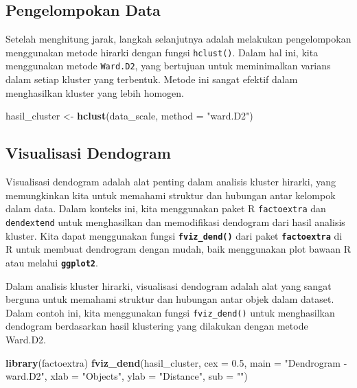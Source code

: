 \documentclass[
  oneside]{book}
\newenvironment{Shaded}{\begin{snugshade}}{\end{snugshade}}
\newcommand{\AttributeTok}[1]{\textcolor[rgb]{0.13,0.29,0.53}{#1}}
\newcommand{\FloatTok}[1]{\textcolor[rgb]{0.00,0.00,0.81}{#1}}
\newcommand{\FunctionTok}[1]{\textcolor[rgb]{0.13,0.29,0.53}{\textbf{#1}}}
\newcommand{\NormalTok}[1]{#1}
\newcommand{\OtherTok}[1]{\textcolor[rgb]{0.56,0.35,0.01}{#1}}
\newcommand{\StringTok}[1]{\textcolor[rgb]{0.31,0.60,0.02}{#1}}
\begin{document}
\subsection*{Pengelompokan Data}\label{pengelompokan-data}

Setelah menghitung jarak, langkah selanjutnya adalah melakukan pengelompokan menggunakan metode hirarki dengan fungsi \texttt{hclust()}. Dalam hal ini, kita menggunakan metode \texttt{Ward.D2}, yang bertujuan untuk meminimalkan varians dalam setiap kluster yang terbentuk. Metode ini sangat efektif dalam menghasilkan kluster yang lebih homogen.

\begin{Shaded}
\begin{Highlighting}[]
\NormalTok{hasil\_cluster }\OtherTok{\textless{}{-}} \FunctionTok{hclust}\NormalTok{(data\_scale, }\AttributeTok{method =} \StringTok{"ward.D2"}\NormalTok{)}
\end{Highlighting}
\end{Shaded}

\subsection*{Visualisasi Dendogram}\label{visualisasi-dendogram}

Visualisasi dendogram adalah alat penting dalam analisis kluster hirarki, yang memungkinkan kita untuk memahami struktur dan hubungan antar kelompok dalam data. Dalam konteks ini, kita menggunakan paket R \texttt{factoextra} dan \texttt{dendextend} untuk menghasilkan dan memodifikasi dendogram dari hasil analisis kluster. Kita dapat menggunakan fungsi \textbf{\texttt{fviz\_dend()}} dari paket \textbf{\texttt{factoextra}} di R untuk membuat dendrogram dengan mudah, baik menggunakan plot bawaan R atau melalui \textbf{\texttt{ggplot2}}.

Dalam analisis kluster hirarki, visualisasi dendogram adalah alat yang sangat berguna untuk memahami struktur dan hubungan antar objek dalam dataset. Dalam contoh ini, kita menggunakan fungsi \texttt{fviz\_dend()} untuk menghasilkan dendogram berdasarkan hasil klustering yang dilakukan dengan metode Ward.D2.

\begin{Shaded}
\begin{Highlighting}[]
\FunctionTok{library}\NormalTok{(factoextra)}
\FunctionTok{fviz\_dend}\NormalTok{(hasil\_cluster, }\AttributeTok{cex =} \FloatTok{0.5}\NormalTok{,}
        \AttributeTok{main =} \StringTok{"Dendrogram {-} ward.D2"}\NormalTok{,}
        \AttributeTok{xlab =} \StringTok{"Objects"}\NormalTok{, }\AttributeTok{ylab =} \StringTok{"Distance"}\NormalTok{, }\AttributeTok{sub =} \StringTok{""}\NormalTok{)}
\end{Highlighting}
\end{Shaded}
\end{document}
